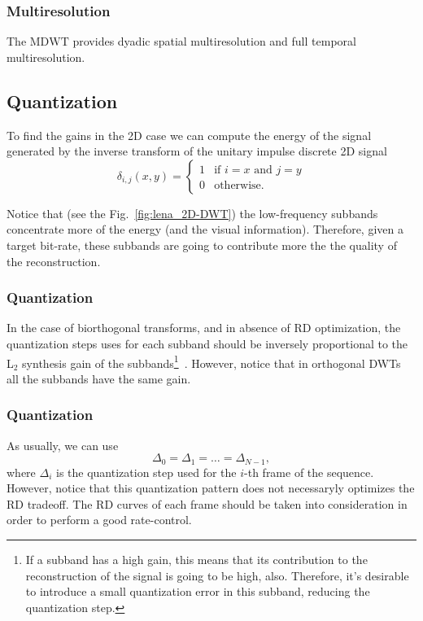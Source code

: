 \subsubsection{Multiresolution}
The $\text{MDWT}$ provides dyadic spatial multiresolution and full
temporal multiresolution.

\subsection{Quantization}
To find the gains in the 2D case we can compute the energy of the
signal generated by the inverse transform of the unitary impulse
discrete 2D signal
\begin{equation}
  \delta_{i,j}(x,y) = 
  \left\{
  \begin{array}{ll}
    1 & \text{if $i=x$ and $j=y$}\\
    0 & \text{otherwise}.
  \end{array}
  \right.
\end{equation}

Notice that (see the Fig.~\ref{fig:lena_2D-DWT}) the low-frequency
subbands concentrate more of the energy (and the visual
information). Therefore, given a target bit-rate, these subbands are going to contribute more the the quality of the reconstruction.

\subsubsection{Quantization}
In the case of biorthogonal transforms, and in absence of RD optimization, the quantization steps uses for each subband should be inversely
proportional to the L$_2$ synthesis gain of the subbands\footnote{If a
  subband has a high gain, this means that its contribution to the
  reconstruction of the signal is going to be high, also. Therefore,
  it's desirable to introduce a small quantization error in this
  subband, reducing the quantization
  step.}~\cite{marcellin2002overview}. However, notice that in orthogonal DWTs all the subbands have the same gain.

\subsubsection{Quantization}
As usually, we can use
\begin{equation}
  \Delta_0=\Delta_1=\dots=\Delta_{N-1},
\end{equation}
where $\Delta_i$ is the quantization step used for the $i$-th frame of
the sequence. However, notice that this quantization pattern does not
necessaryly optimizes the RD tradeoff. The RD curves of each frame
should be taken into consideration in order to perform a good
rate-control.

